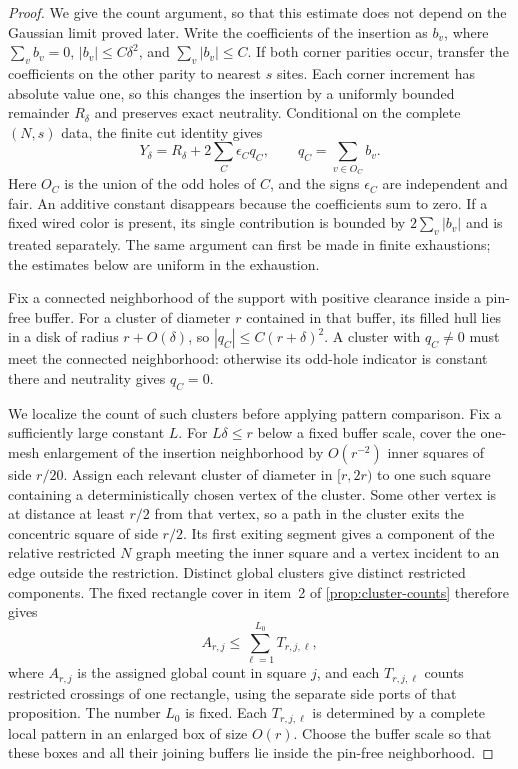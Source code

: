 \begin{proof}
We give the count argument, so that this estimate does not depend on the
Gaussian limit proved later. Write the coefficients of the insertion as
$b_v$, where $\sum_v b_v=0$, $|b_v|\le C\delta^2$, and
$\sum_v|b_v|\le C$. If both corner parities occur, transfer the
coefficients on the other parity to nearest $s$ sites. Each corner
increment has absolute value one, so this changes the insertion by a
uniformly bounded remainder $R_\delta$ and preserves exact neutrality.
Conditional on the complete $(N,s)$ data, the finite cut identity gives
\begin{equation}
 Y_\delta=R_\delta+2\sum_C \epsilon_C q_C,
 \qquad q_C=\sum_{v\in O_C}b_v.
 \label{eq:screen-signed-mass}
\end{equation}
Here $O_C$ is the union of the odd holes of $C$, and the signs
$\epsilon_C$ are independent and fair. An additive constant disappears
because the coefficients sum to zero. If a fixed wired color is present,
its single contribution is bounded by $2\sum_v|b_v|$ and is treated
separately. The same argument can first be made in finite exhaustions;
the estimates below are uniform in the exhaustion.

Fix a connected neighborhood of the support with positive clearance inside
a pin-free buffer. For a cluster of diameter $r$ contained in that buffer,
its filled hull lies in a disk of radius $r+O(\delta)$, so
$|q_C|\le C(r+\delta)^2$. A cluster with $q_C\ne0$ must meet the connected
neighborhood: otherwise its odd-hole indicator is constant there and
neutrality gives $q_C=0$.

We localize the count of such clusters before applying pattern comparison.
Fix a sufficiently large constant $L$. For $L\delta\le r$ below a fixed
buffer scale, cover the one-mesh enlargement of the insertion neighborhood
by $O(r^{-2})$ inner squares of side $r/20$. Assign each relevant cluster
of diameter in $[r,2r)$ to one such square containing a deterministically
chosen vertex of the cluster. Some other vertex is at distance at least
$r/2$ from that vertex, so a path in the cluster exits the concentric square
of side $r/2$. Its first exiting segment gives a component of the relative
restricted $N$ graph meeting the inner square and a vertex incident to an
edge outside the restriction. Distinct global clusters give distinct
restricted components. The fixed rectangle cover in item~2 of
\cref{prop:cluster-counts} therefore gives
\[
 A_{r,j}\le\sum_{\ell=1}^{L_0}T_{r,j,\ell},
\]
where $A_{r,j}$ is the assigned global count in square $j$, and each
$T_{r,j,\ell}$ counts restricted crossings of one rectangle, using the
separate side ports of that proposition. The number $L_0$ is fixed.
Each $T_{r,j,\ell}$ is determined by a complete local pattern in an
enlarged box of size $O(r)$. Choose the buffer scale so that these boxes
and all their joining buffers lie inside the pin-free neighborhood.


\end{proof}
